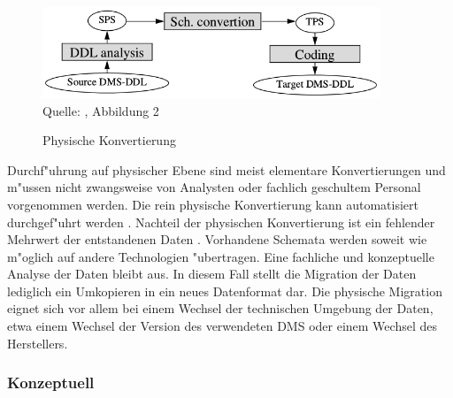 \begin{figure}[h!]
	\centering
	\caption{Physische Konvertierung}
	\label{pic:conversion_physical}
	\includegraphics[width=0.9\textwidth]{../images/strategies_fig_02a.png} \\
	\tiny Quelle: \citep{henrard-2002}, Abbildung 2
\end{figure}

Durchf"uhrung auf physischer Ebene sind meist elementare Konvertierungen und m"ussen nicht zwangsweise von Analysten oder fachlich geschultem Personal vorgenommen werden. Die rein physische Konvertierung kann automatisiert durchgef"uhrt werden \citep{abiteboul-1999}.
\lb
Nachteil der physischen Konvertierung ist ein fehlender Mehrwert der entstandenen Daten \citep{henrard-2002}. Vorhandene Schemata werden soweit wie m"oglich auf andere Technologien "ubertragen. Eine fachliche und konzeptuelle Analyse der Daten bleibt aus. In diesem Fall stellt die Migration der Daten lediglich ein Umkopieren in ein neues Datenformat dar.
\lb
Die physische Migration eignet sich vor allem bei einem Wechsel der technischen Umgebung der Daten, etwa einem Wechsel der Version des verwendeten DMS oder einem Wechsel des Herstellers. %

\subsubsection{Konzeptuell}

